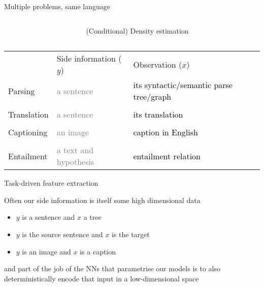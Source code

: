 \documentclass[14pt]{beamer}
\begin{document}
\begin{frame}{Multiple problems, same language}



\begin{small}

\begin{columns}
\begin{column}{0.3\textwidth}
\end{column}
\begin{column}{0.6\textwidth}
\alert{(Conditional) Density estimation}
\end{column}

\end{columns}

\begin{tabular}{p{2cm} p{4cm} p{4cm}}
 & Side information ($y$) & Observation ($x$) \\
Parsing &   \textcolor{gray}{a sentence} & \textcolor{black}{its syntactic/semantic parse tree/graph} \\
&&\\
Translation &  \textcolor{gray}{a sentence} & \textcolor{black}{its translation} \\
&&\\
Captioning &  \textcolor{gray}{an image} & \textcolor{black}{caption in English} \\
&&\\
Entailment  & \textcolor{gray}{a text and hypothesis} & \textcolor{black}{entailment relation}
\end{tabular}
\end{small}

\end{frame}


\begin{frame}{Task-driven feature extraction}

Often our side information is itself some high dimensional data
\begin{itemize}
	\item $y$ is a sentence and $x$ a tree
	\item $y$ is the source sentence and $x$ is the target
	\item $y$ is an image and $x$ is a caption
\end{itemize}
and part of the job of the NNs that parametrise our models is to also \alert{deterministically} encode that input in a low-dimensional space


\end{frame}
\end{document}
